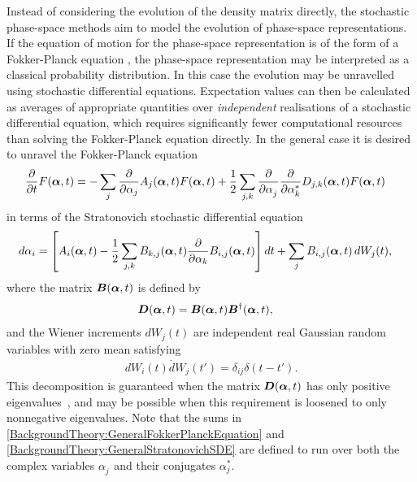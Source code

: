 Instead of considering the evolution of the density matrix directly, the stochastic phase-space methods aim to model the evolution of phase-space representations.  If the equation of motion for the phase-space representation is of the form of a Fokker-Planck equation \citep{GardinerHSM}, the phase-space representation may be interpreted as a classical probability distribution.  In this case the evolution may be unravelled using stochastic differential equations.  Expectation values can then be calculated as averages of appropriate quantities over \emph{independent} realisations of a stochastic differential equation, which requires significantly fewer computational resources than solving the Fokker-Planck equation directly.  In the general case it is desired to unravel the Fokker-Planck equation
\begin{align}
    \frac{\partial}{\partial t}F(\vect{\alpha}, t) &= - \sum_j \frac{\partial}{\partial \alpha_j} A_j(\vect{\alpha}, t) F(\vect{\alpha}, t) + \frac{1}{2} \sum_{j, k} \frac{\partial}{\partial \alpha_j^{\phantom{*}}} \frac{\partial}{\partial \alpha_k^*} D_{j,k}(\vect{\alpha}, t) F(\vect{\alpha}, t) \label{BackgroundTheory:GeneralFokkerPlanckEquation}
\end{align}
in terms of the Stratonovich stochastic differential equation \citep{GardinerHSM}
\begin{align}
    d \alpha_i &= \left[A_i(\vect{\alpha}, t)  - \frac{1}{2} \sum_{j, k} B_{k, j}(\vect{\alpha}, t) \frac{\partial }{\partial \alpha_k}B_{i,j}(\vect{\alpha}, t) \right] dt + \sum_j B_{i,j}(\vect{\alpha}, t) \,d W_j(t), \label{BackgroundTheory:GeneralStratonovichSDE}
\end{align}
where the matrix $\bm{B}(\bm{\alpha}, t)$ is defined by
\begin{align}
    \bm{D}(\bm{\alpha}, t) &= \bm{B}(\bm{\alpha}, t) \bm{B}^\dagger(\bm{\alpha}, t),
\end{align}
and the Wiener increments $d W_j(t)$ are independent real Gaussian random variables with zero mean satisfying
\begin{align}
    \overline{d W_i(t) dW_j(t')} = \delta_{i j}\delta(t - t').
\end{align}
This decomposition is guaranteed when the matrix $\bm{D}(\bm{\alpha}, t)$ has only positive eigenvalues~\citep{GardinerHSM}, and may be possible when this requirement is loosened to only nonnegative eigenvalues. Note that the sums in \eqref{BackgroundTheory:GeneralFokkerPlanckEquation} and \eqref{BackgroundTheory:GeneralStratonovichSDE} are defined to run over both the complex variables $\alpha_j^{\phantom{*}}$ and their conjugates $\alpha_j^*$.

